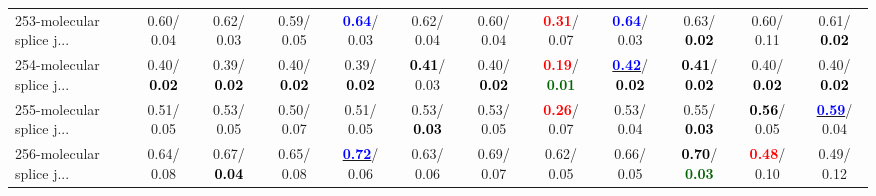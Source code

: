 \begin{table}[h]
\begin{center}
{\begin{tabular}{lc|c|c|c|c|c|c|c|c|c|c}
253-molecular splice j... &   0.60/  0.04 &   0.62/  0.03 &   0.59/  0.05 & \textcolor{blue}{\textbf{  0.64}}/  0.03 &   0.62/  0.04 &   0.60/  0.04 & \textcolor{red}{\textbf{  0.31}}/  0.07 & \textcolor{blue}{\textbf{  0.64}}/  0.03 &   0.63/\textcolor{black}{\textbf{  0.02}} &   0.60/  0.11 &   0.61/\textcolor{black}{\textbf{  0.02}} \\
254-molecular splice j... &   0.40/\textcolor{black}{\textbf{  0.02}} &   0.39/\textcolor{black}{\textbf{  0.02}} &   0.40/\textcolor{black}{\textbf{  0.02}} &   0.39/\textcolor{black}{\textbf{  0.02}} & \textcolor{black}{\textbf{  0.41}}/  0.03 &   0.40/\textcolor{black}{\textbf{  0.02}} & \textcolor{red}{\textbf{  0.19}}/\textcolor{darkgreen}{\textbf{  0.01}} & \underline{\textcolor{blue}{\textbf{  0.42}}}/\textcolor{black}{\textbf{  0.02}} & \textcolor{black}{\textbf{  0.41}}/\textcolor{black}{\textbf{  0.02}} &   0.40/\textcolor{black}{\textbf{  0.02}} &   0.40/\textcolor{black}{\textbf{  0.02}} \\
255-molecular splice j... &   0.51/  0.05 &   0.53/  0.05 &   0.50/  0.07 &   0.51/  0.05 &   0.53/\textcolor{black}{\textbf{  0.03}} &   0.53/  0.05 & \textcolor{red}{\textbf{  0.26}}/  0.07 &   0.53/  0.04 &   0.55/\textcolor{black}{\textbf{  0.03}} & \textcolor{black}{\textbf{  0.56}}/  0.05 & \underline{\textcolor{blue}{\textbf{  0.59}}}/  0.04 \\
256-molecular splice j... &   0.64/  0.08 &   0.67/\textcolor{black}{\textbf{  0.04}} &   0.65/  0.08 & \underline{\textcolor{blue}{\textbf{  0.72}}}/  0.06 &   0.63/  0.06 &   0.69/  0.07 &   0.62/  0.05 &   0.66/  0.05 & \textcolor{black}{\textbf{  0.70}}/\textcolor{darkgreen}{\textbf{  0.03}} & \textcolor{red}{\textbf{  0.48}}/  0.10 &   0.49/  0.12 \\\end{tabular}}\label{stratsALCKappa7AllReduxa}
\end{center}
\end{table}
